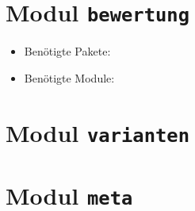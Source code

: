 \section{Modul \texttt{bewertung}}\label{sec:modul-bewertung}
\begin{itemize}
	\item Benötigte Pakete: 
	\item Benötigte Module: 
\end{itemize}

\section{Modul \texttt{varianten}}\label{sec:modul-varianten}

\section{Modul \texttt{meta}}\label{sec:modul-meta}
